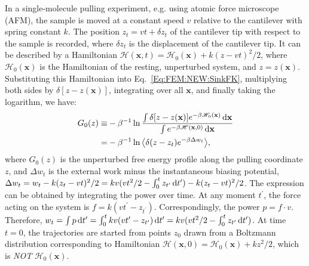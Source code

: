 In a single-molecule pulling experiment, e.g. using atomic force microscope (AFM), the sample is moved at a constant speed $v$ relative to the cantilever with spring constant $k$. The position $z_t=vt+\delta z_t$ of the cantilever tip with respect to the sample is recorded, where $\delta z_t$ is the displacement of the cantilever tip. It can be described by a Hamiltonian $\mathscr{H}(\mathbf{x},t)=\mathscr{H}_0(\mathbf{x})+k(z-vt)^2/2$, where $\mathscr{H}_0(\mathbf{x})$ is the Hamiltonian of the resting, unperturbed system, and $z=z(\mathbf{x})$. Substituting this Hamiltonian into Eq.~\ref{Eq:FEM:NEW:SinkFK}, multiplying both sides by $\delta[z-z(\mathbf{x})]$, integrating over all $\mathbf{x}$, and finally taking the logarithm, we have:
\begin{align}
	G_0(z)\equiv&-\beta^{-1}\ln{\frac{\int\delta[z-z(\mathbf{x})]e^{-\beta \mathscr{H}_0(\mathbf{x})}\mathop{}\!\mathrm{d}\mathbf{x}}{\int e^{-\beta \mathscr{H}(\mathbf{x},0)}\mathop{}\!\mathrm{d}\mathbf{x}}}\notag\\
	      =&-\beta^{-1}\ln{\left<\delta(z-z_t)e^{-\beta \Delta w_t}\right>},
\end{align}
where $G_0(z)$ is the unperturbed free energy profile along the pulling coordinate $z$, and $\Delta w_t$ is the external work minus the instantaneous biasing potential, $\Delta w_t=w_t-k(z_t-vt)^2/2=kv(vt^2/2-\int_0^t z_{t^\prime}\mathop{}\!\mathrm{d} t^\prime)-k(z_t-vt)^2/2$. The expression can be obtained by integrating the power over time. At any moment $t^\prime$, the force acting on the system is $f=k(vt^\prime-z_{t^\prime})$. Correspondingly, the power $p=f\cdot v$. Therefore, $w_t=\int p\mathop{}\!\mathrm{d} t^\prime=\int_0^t kv(vt^\prime-z_{t^\prime})\mathop{}\!\mathrm{d} t^\prime=kv(vt^2/2-\int_0^t z_{t^\prime}\mathop{}\!\mathrm{d} t^\prime)$. At time $t=0$, the trajectories are started from points $z_0$ drawn from a Boltzmann distribution corresponding to Hamiltonian $\mathscr{H}(\mathbf{x},0)=\mathscr{H}_0(\mathbf{x})+kz^2/2$, which is \emph{NOT} $\mathscr{H}_0(\mathbf{x})$.

